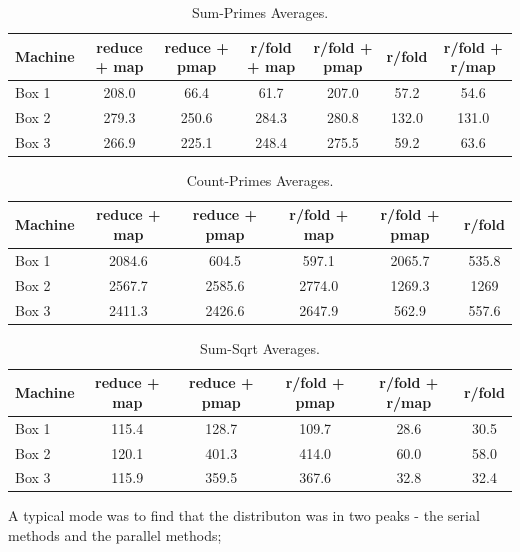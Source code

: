 \documentclass[12pt]{article}
\begin{document}
\begin{table}
\begin{center}
\begin{tabular}{|l|c|c|c|c|c|c|}
\hline
Machine & reduce + map & reduce + pmap & r/fold + map & r/fold + pmap & r/fold & r/fold + r/map \\
\hline
Box 1 & 208.0 & 66.4 & 61.7 & 207.0 & 57.2 &  54.6 \\
Box 2 & 279.3 & 250.6 & 284.3 & 280.8 & 132.0 & 131.0 \\
Box 3 & 266.9 & 225.1 & 248.4 & 275.5 & 59.2 & 63.6 \\
\hline
\end{tabular}
\end{center}
\caption{Sum-Primes Averages.}\label{table:sum-primes}
\end{table}

\begin{table}
\begin{center}
\begin{tabular}{|l|c|c|c|c|c|}
\hline
Machine & reduce + map & reduce + pmap & r/fold + map & r/fold + pmap & r/fold\\
\hline
Box 1 & 2084.6 & 604.5 & 597.1 & 2065.7 & 535.8\\
Box 2 & 2567.7 & 2585.6 & 2774.0 & 1269.3 & 1269 \\
Box 3 & 2411.3 & 2426.6 & 2647.9 & 562.9 & 557.6\\
\hline
\end{tabular}
\end{center}
\caption{Count-Primes Averages.}\label{table:sum-primes}
\end{table}

\begin{table}
\begin{center}
\begin{tabular}{|l|c|c|c|c|c|}
\hline
Machine & reduce + map & reduce + pmap & r/fold + pmap & r/fold + r/map & r/fold\\
\hline
Box 1 & 115.4 & 128.7 & 109.7 & 28.6 & 30.5\\
Box 2 & 120.1 & 401.3 & 414.0 & 60.0 & 58.0 \\
Box 3 & 115.9 & 359.5 & 367.6 & 32.8 & 32.4\\
\hline
\end{tabular}
\end{center}
\caption{Sum-Sqrt Averages.}\label{table:sum-primes}
\end{table}

A typical mode was to find that the distributon was in two peaks - the serial methods and the parallel methods; 
\end{document}
